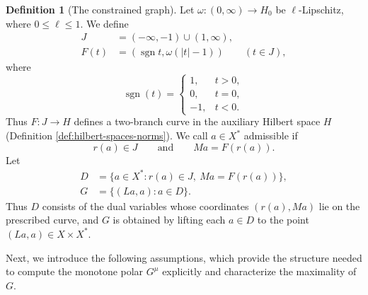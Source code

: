 \documentclass[11pt]{article}
\newcommand{\sgn}{\operatorname{sgn}}
\theoremstyle{definition}
\newtheorem{definition}{Definition}
\theoremstyle{remark}
\begin{document}
\begin{definition}[The constrained graph]
\label{def:construction-graph}
Let $\omega:(0,\infty)\to H_0$ be $\ell$-Lipschitz, where $0\le\ell\le1$. We define 
\[
\begin{aligned}
J&=(-\infty,-1)\cup(1,\infty),\\
F(t)&=(\sgn t,\omega(|t|-1))\qquad(t\in J), 
\end{aligned}
\]
where \[
\operatorname{sgn}(t)=
\begin{cases}
1, & t>0,\\
0, & t=0,\\
-1, & t<0.
\end{cases}
\] 
Thus $F:J\to H$ defines a two-branch curve in the auxiliary Hilbert
space $H$ (Definition \ref{def:hilbert-spaces-norms}). We call $a\in X^*$ admissible if
\[
r(a)\in J
\qquad\text{and}\qquad
Ma=F(r(a)).
\]
Let
\begin{equation}
\begin{aligned}
D&=\{a\in X^*:r(a)\in J,\ Ma=F(r(a))\},\\
G&=\{(La,a):a\in D\}.
\end{aligned}
\label{eq:abs-full-graph}
\end{equation}
Thus $D$ consists of the dual variables whose coordinates
$(r(a),Ma)$ lie on the prescribed curve, and $G$ is obtained by
lifting each $a\in D$ to the point $(La,a)\in X\times X^*$.







\end{definition}




Next, we introduce the following assumptions, which provide the structure needed to compute the monotone polar $G^\mu$ explicitly and characterize the maximality of $G$. 
\end{document}
